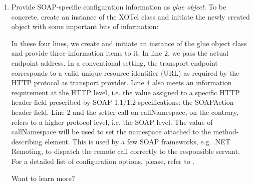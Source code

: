\begin{enumerate}
\item Provide SOAP-specific configuration information as \emph{glue object}. To be concrete, create an 
instance of the XOTcl class  and initiate the newly created object with some 
important bits of information:

In these four lines, we create and initiate an instance of the glue object class and provide three 
information items to it. In line 2, we pass the actual endpoint address. In a conventional setting, the 
transport endpoint corresponds to a valid unique resource identifier (URL) as required by the HTTP 
protocol as transport provider. Line 4 also meets an information requirement at the HTTP level, i.e. the 
value assigned to a specific HTTP header field prescribed by SOAP 1.1/1.2 specifications: the 
SOAPAction header field. Line 2 and the setter call on callNamespace, on the contrary, refers to a higher 
protocol level, i.e. the SOAP level. The value of callNamespace will be used to set the namespace 
attached to the method-describing element. This is used by a few SOAP frameworks, e.g. .NET 
Remoting, to dispatch the remote call correctly to the responsible servant. For a detailed list of 
configuration options, please, refer to .

Want to learn more?


\end{enumerate}
